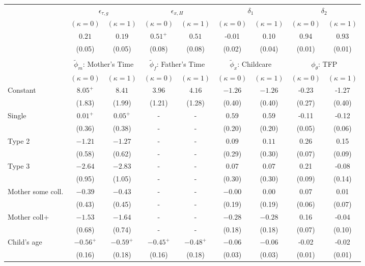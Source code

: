 \begin{tabular}{lcccccccc}\\\toprule
 & \multicolumn{2}{c}{$\epsilon_{\tau,g}$} & \multicolumn{2}{c}{$\epsilon_{x,H}$} & \multicolumn{2}{c}{$\delta_{1}$} & \multicolumn{2}{c}{$\delta_{2}$} \\
& $(\kappa=0)$ & $(\kappa=1)$ & $(\kappa=0)$ & $(\kappa=1)$ & $(\kappa=0)$ & $(\kappa=1)$ & $(\kappa=0)$ & $(\kappa=1)$ \\\cmidrule(r){2-3}\cmidrule(r){4-5}\cmidrule(r){6-7}\cmidrule(r){8-9}
&$0.21$&$0.19$&$0.51^{+}$&$0.51$&-0.01&0.10&0.94&0.93\\
&(0.05)&(0.05)&(0.08)&(0.08)&(0.02)&(0.04)&(0.01)&(0.01)\\
&&&&&&&&\\
 & \multicolumn{2}{c}{$\tilde{\phi}_{m}$: Mother's Time} & \multicolumn{2}{c}{$\tilde{\phi}_{f}$: Father's Time} & \multicolumn{2}{c}{$\tilde{\phi}_{x}$: Childcare} & \multicolumn{2}{c}{$\phi_{\theta}$: TFP} \\
& $(\kappa=0)$ & $(\kappa=1)$ & $(\kappa=0)$ & $(\kappa=1)$ & $(\kappa=0)$ & $(\kappa=1)$ & $(\kappa=0)$ & $(\kappa=1)$ \\\cmidrule(r){2-3}\cmidrule(r){4-5}\cmidrule(r){6-7}\cmidrule(r){8-9}
Constant&$8.05^{+}$&$8.41$&$3.96$&$4.16$&$-1.26$&$-1.26$&-0.23&-1.27\\
&(1.83)&(1.99)&(1.21)&(1.28)&(0.40)&(0.40)&(0.27)&(0.40)\\
Single&$0.01^{+}$&$0.05^{+}$&-&-&$0.59$&$0.59$&-0.11&-0.12\\
&(0.36)&(0.38)&-&-&(0.20)&(0.20)&(0.05)&(0.06)\\
Type 2&$-1.21$&$-1.27$&-&-&$0.09$&$0.11$&0.26&0.15\\
&(0.58)&(0.62)&-&-&(0.29)&(0.30)&(0.07)&(0.09)\\
Type 3&$-2.64$&$-2.83$&-&-&$0.07$&$0.07$&0.21&-0.08\\
&(0.95)&(1.05)&-&-&(0.30)&(0.30)&(0.09)&(0.14)\\
Mother some coll.&$-0.39$&$-0.43$&-&-&$-0.00$&$0.00$&0.07&0.01\\
&(0.43)&(0.45)&-&-&(0.19)&(0.19)&(0.06)&(0.07)\\
Mother coll+&$-1.53$&$-1.64$&-&-&$-0.28$&$-0.28$&0.16&-0.04\\
&(0.68)&(0.74)&-&-&(0.18)&(0.18)&(0.07)&(0.10)\\
Child's age&$-0.56^{+}$&$-0.59^{+}$&$-0.45^{+}$&$-0.48^{+}$&$-0.06$&$-0.06$&-0.02&-0.02\\
&(0.16)&(0.18)&(0.16)&(0.18)&(0.03)&(0.03)&(0.01)&(0.01)\\

\end{tabular}
